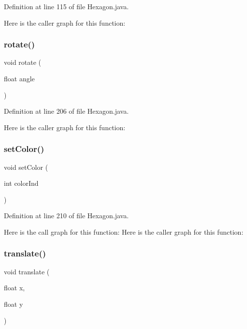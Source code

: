 Definition at line 115 of file Hexagon.\+java.

Here is the caller graph for this function\+:
\mbox{\label{classsf_1_1unitingtwist_1_1_hexagon_a523014438b1a8318ec0915c2ce0a3430}} 
\subsubsection{rotate()}
{\footnotesize\ttfamily void rotate (\begin{DoxyParamCaption}\item[{float}]{angle }\end{DoxyParamCaption})}



Definition at line 206 of file Hexagon.\+java.

Here is the caller graph for this function\+:
\mbox{\label{classsf_1_1unitingtwist_1_1_hexagon_a1cc9d5666b1d32b3e35f88192b3b4d3f}} 
\subsubsection{set\+Color()}
{\footnotesize\ttfamily void set\+Color (\begin{DoxyParamCaption}\item[{int}]{color\+Ind }\end{DoxyParamCaption})}



Definition at line 210 of file Hexagon.\+java.

Here is the call graph for this function\+:
Here is the caller graph for this function\+:
\mbox{\label{classsf_1_1unitingtwist_1_1_hexagon_aaf32fd3f86bbef7279898dd958c847cd}} 
\subsubsection{translate()}
{\footnotesize\ttfamily void translate (\begin{DoxyParamCaption}\item[{float}]{x,  }\item[{float}]{y }\end{DoxyParamCaption})}



